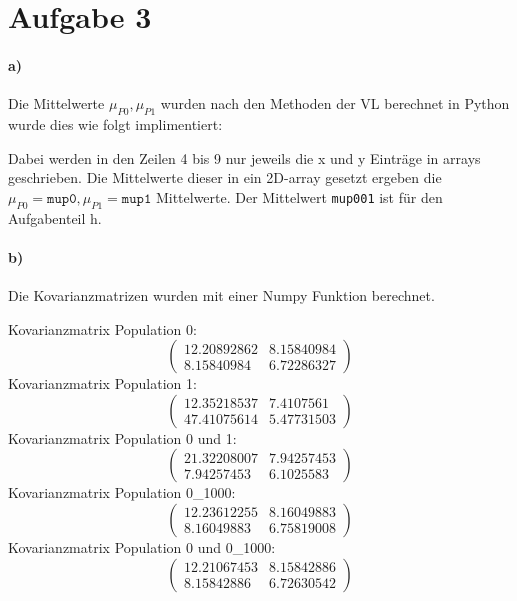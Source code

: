 \section{Aufgabe 3}

\label{sec:Aufgab3}

\paragraph{a)}
Die Mittelwerte $\mu_{P0},\mu_{P1}$ wurden nach den Methoden der VL berechnet in Python wurde dies wie folgt 
implimentiert:

Dabei werden in den Zeilen 4 bis 9 nur jeweils die x und y Einträge in arrays geschrieben. Die Mittelwerte 
dieser in ein 2D-array gesetzt ergeben die $\mu_{P0}= \texttt{mup0},\mu_{P1}=\texttt{mup1}$ Mittelwerte. 
Der Mittelwert \texttt{mup001} ist für den Aufgabenteil h.
\paragraph{b)}
Die Kovarianzmatrizen wurden mit einer Numpy Funktion berechnet.

Kovarianzmatrix Population 0:
\begin{equation}
\begin{pmatrix}
12.20892862& 8.15840984\\
8.15840984& 6.72286327
\end{pmatrix}
\end{equation}
Kovarianzmatrix Population 1:
\begin{equation}
\begin{pmatrix}
12.35218537 & 7.4107561\\4
 7.41075614 & 5.47731503
\end{pmatrix}
\end{equation}
Kovarianzmatrix Population 0 und 1:
\begin{equation}
\begin{pmatrix}
21.32208007 & 7.94257453\\
 7.94257453 & 6.1025583 
\end{pmatrix}
\end{equation}
Kovarianzmatrix Population 0\_1000:
\begin{equation}
\begin{pmatrix}
12.23612255 & 8.16049883\\
 8.16049883 & 6.75819008
\end{pmatrix}
\end{equation}
Kovarianzmatrix Population 0 und 0\_1000:
\begin{equation}
\begin{pmatrix}
12.21067453 & 8.15842886\\
 8.15842886 & 6.72630542
\end{pmatrix}
\end{equation}
